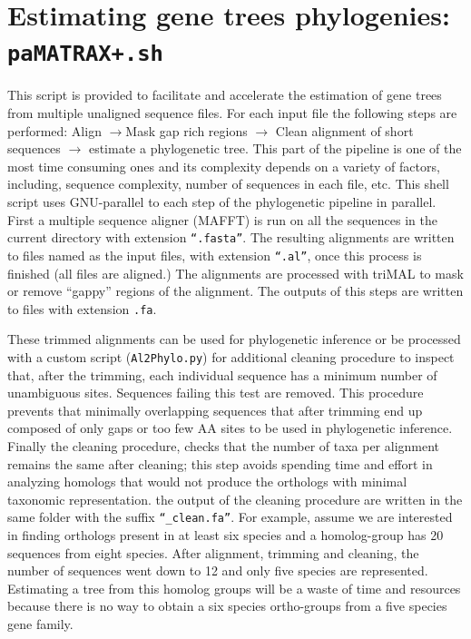 \documentclass[10pt]{article}
\begin{document}
\section{Estimating gene trees phylogenies: \texttt{paMATRAX+.sh}}
This script is provided to facilitate and accelerate the estimation of 
gene trees from multiple unaligned sequence files. For each input file the following steps are performed:
Align $\rightarrow $Mask gap rich regions $\rightarrow$ Clean alignment
of short sequences $\rightarrow$ estimate a phylogenetic tree.  This
part of the pipeline is one of the most time consuming ones and its
complexity depends on a variety of factors, including, sequence
complexity, number of sequences in each file, etc. This shell script
uses GNU-parallel to each step of the phylogenetic pipeline in
parallel. First a multiple sequence aligner (MAFFT) is run on all the
sequences in the current directory with extension
\texttt{``.fasta''}. The resulting alignments are written to files
named as the input files, with extension \texttt{``.al''}, once this
process is finished (all files are aligned.) The alignments are
processed with triMAL to mask or remove ``gappy'' regions of the
alignment. The outputs of this steps are written to files with
extension \texttt{.fa}.

These trimmed alignments can be used for phylogenetic inference or be
processed with a custom script (\texttt{Al2Phylo.py}) for additional
cleaning procedure to inspect that, after the trimming, each
individual sequence has a minimum number of unambiguous
sites. Sequences failing this test are removed. This procedure
prevents that minimally overlapping sequences that after trimming end
up composed of only gaps or too few AA sites to be used in
phylogenetic inference. Finally the cleaning procedure, checks that
the number of taxa per alignment remains the same after cleaning; this
step avoids spending time and effort in analyzing homologs that would
not produce the orthologs with minimal taxonomic representation. the
output of the cleaning procedure are written in the same folder with
the suffix \texttt{``\_clean.fa''}. For example, assume we are
interested in finding orthologs present in at least six species and a
homolog-group has 20 sequences from eight species. After alignment,
trimming and cleaning, the number of sequences went down to 12 and
only five species are represented. Estimating a tree from this homolog
groups will be a waste of time and resources because there is no way
to obtain a six species ortho-groups from a five species gene family.
\end{document}

